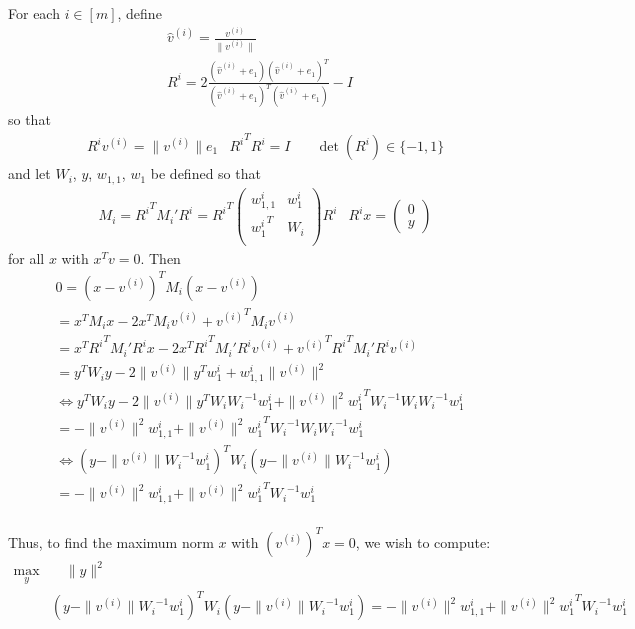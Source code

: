 For each $i \in [m]$, define
\begin{align*}
\hat v^{(i)} = \frac{v^{(i)}}{\|v^{(i)}\|} \\
R^i = 2\frac{(\hat v^{(i)} + e_1)(\hat v^{(i)} + e_1)^T}{(\hat v^{(i)} + e_1)^T(\hat v^{(i)} + e_1)} - I
\end{align*}
so that
\begin{align*}
& {R^i}v^{(i)} = \|v^{(i)}\|e_1 & {R^i}^T{R^i} = I & \quad \det({R^i}) \in \{-1, 1\}
\end{align*}
and let $W_i$, $y$, $w_{1,1}$, $w_1$ be defined so that
\begin{align*}
& M_i = {R^i}^T M_i' {R^i} = {R^i}^T\left( \begin{array}{cc}
{w_{1,1}^i} & {w_1^i} \\
{w_1^i}^T	& {W_i}  \\
\end{array} \right){R^i} &
{R^i}x = \left(\begin{array}{c}
0 \\
y
\end{array}\right)
\end{align*}
for all $x$ with $x^Tv = 0$.
Then
\begin{align*}
0 = \left(x - {v^{(i)}}\right)^TM_i\left(x - {v^{(i)}}\right) \\
= x^TM_ix - 2x^TM_i{v^{(i)}} + {v^{(i)}}^TM_i{v^{(i)}} \\
= x^T{R^i}^TM_i'{R^i}x - 2x^T{R^i}^TM_i'{R^i}{v^{(i)}} + {v^{(i)}}^T{R^i}^TM_i'{R^i}{v^{(i)}} \\
= y^T{W_i}y - 2\|v^{(i)}\|y^Tw_1^i + {w_{1,1}^i}\|v^{(i)}\|^2 \\
\Longleftrightarrow y^T{W_i}y - 2\|v^{(i)}\|y^T{W_i}{W_i}^{-1}{w_1^i} + \|v^{(i)}\|^2{{w_1^i}}^T{W_i}^{-1}{W_i}{W_i}^{-1}{w_1^i} \\
= - \|v^{(i)}\|^2{w_{1,1}^i} + \|v^{(i)}\|^2{{w_1^i}}^T{W_i}^{-1}{W_i}{W_i}^{-1}{w_1^i} \\
\Longleftrightarrow \left(y - \|v^{(i)}\|{W_i}^{-1}{w_1^i}\right)^T{W_i}\left(y - \|v^{(i)}\|{W_i}^{-1}{w_1^i}\right) \\
= - \|v^{(i)}\|^2{w_{1,1}^i} + \|v^{(i)}\|^2{{{w_1^i}}}^T{W_i}^{-1}{{w_1^i}} \\
\end{align*}

Thus, to find the maximum norm $x$ with $\left(v^{(i)}\right)^Tx = 0$, we wish to compute:
\begin{align*}
\max_{y} & \quad \|y\|^2  \\
 & \left(y - \|v^{(i)}\|{W_i}^{-1}{w_1^i}\right)^T{W_i}\left(y - \|v^{(i)}\|{W_i}^{-1}{w_1^i}\right) = - \|v^{(i)}\|^2{w_{1,1}^i} + \|v^{(i)}\|^2{{w_1^i}}^T{W_i}^{-1}{w_1^i}
\end{align*}

